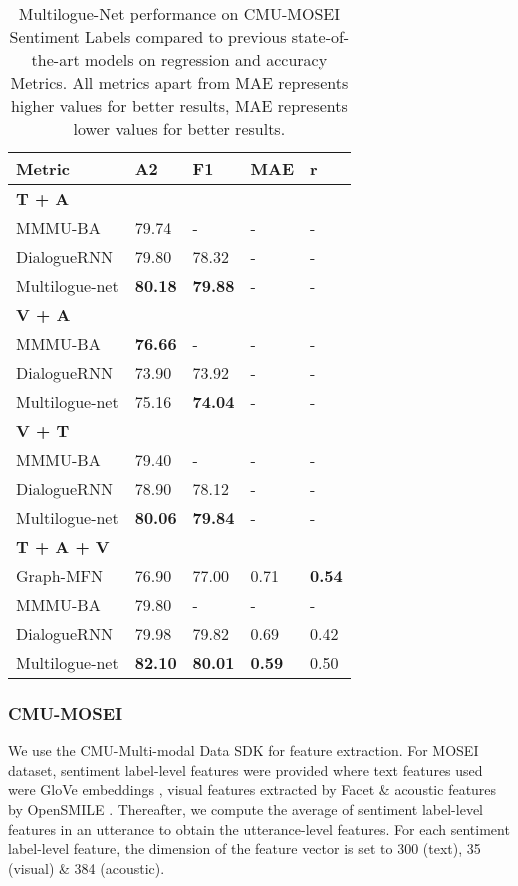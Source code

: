 \documentclass[11pt,a4paper]{article}
\begin{document}
\begin{table}
\centering
\begin{tabular}{lllll}
\hline
\textbf{Metric} & \textbf{A2} & \textbf{F1}& \textbf{MAE} & \textbf{r}\\
\hline
\textbf{T + A} \\
\hline
MMMU-BA & 79.74 & - & - & - \\
DialogueRNN & 79.80 & 78.32 & - & -\\
Multilogue-net & \textbf{80.18} & \textbf{79.88} & - & -\\
\hline

\textbf{V + A} \\
\hline
MMMU-BA & \textbf{76.66} & - & - & - \\
DialogueRNN & 73.90 & 73.92 & - & -\\
Multilogue-net & 75.16 & \textbf{74.04} & - & -\\
\hline

\textbf{V + T} \\
\hline
MMMU-BA & 79.40 & - & - & - \\
DialogueRNN & 78.90 & 78.12 & - & -\\
Multilogue-net & \textbf{80.06} & \textbf{79.84} & - & -\\
\hline

\textbf{T + A + V} \\
\hline
Graph-MFN  & 76.90 & 77.00 & 0.71 & \textbf{0.54} \\
MMMU-BA & 79.80 & - & - & - \\
DialogueRNN & 79.98 & 79.82 & 0.69 & 0.42\\
Multilogue-net & \textbf{82.10} & \textbf{80.01} & \textbf{0.59} & 0.50\\
\hline


\end{tabular}
\caption{\label{tab:mosei}
Multilogue-Net performance on CMU-MOSEI Sentiment Labels compared to previous state-of-the-art models on regression and accuracy Metrics. All metrics apart from MAE represents higher values for better results, MAE represents lower values for better results.
}
\end{table}

\subsubsection{CMU-MOSEI}
We use the CMU-Multi-modal Data SDK \cite{mosei} for feature extraction. For MOSEI dataset, sentiment label-level features were provided where text features used were GloVe embeddings \cite{glove}, visual features extracted by Facet \cite{facet} \& acoustic features by OpenSMILE \cite{opensmile}. Thereafter, we compute the average of sentiment label-level features in an utterance to obtain the utterance-level features. For each sentiment label-level feature, the dimension of the feature vector is set to 300 (text), 35 (visual) \& 384 (acoustic).
\end{document}
